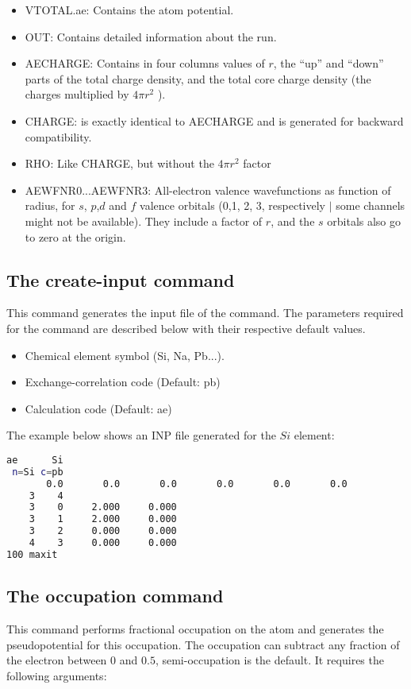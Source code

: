 \begin{itemize}
	\item VTOTAL.ae: Contains the atom potential.
	\item OUT: Contains detailed information about the run.
	\item AECHARGE: Contains in four columns values of $r$, the “up” and “down” parts of the total charge density, and the total core charge density (the charges multiplied by $4\pi r^{2}$ ).
	\item CHARGE: is exactly identical to AECHARGE and is generated for backward compatibility.
	\item RHO: Like CHARGE, but without the $4\pi r^{2}$ factor
	\item AEWFNR0...AEWFNR3: All-electron valence wavefunctions as function of radius, for $s$, $p$,$ d$ and $f$ valence orbitals (0,1, 2, 3, respectively $\mid$ some channels might not be available). They include a factor of $r$, and the $s$ orbitals also go to zero at the origin.
\end{itemize}

\subsection{The create-input command}

This command generates the input file of the  command. The parameters required for the command are described below with their respective default values.
\begin{itemize}
	\item  Chemical element symbol (Si, Na, Pb...).
	\item  Exchange-correlation code (Default: pb)
	\item  Calculation code (Default: ae) 
\end{itemize}

The example below shows an INP file generated for the $Si$ element:

\begin{lstlisting}[language=bash,caption={Example of INP file for Si}]
   ae      Si
 n=Si c=pb
       0.0       0.0       0.0       0.0       0.0       0.0
    3    4
    3    0     2.000     0.000
    3    1     2.000     0.000
    3    2     0.000     0.000
    4    3     0.000     0.000
100 maxit
\end{lstlisting}

\subsection{The occupation command}
This command performs fractional occupation on the atom and generates the pseudopotential for this occupation. The occupation can subtract any fraction of the electron between $0$ and $0.5$, semi-occupation is the default. It requires the following arguments:

